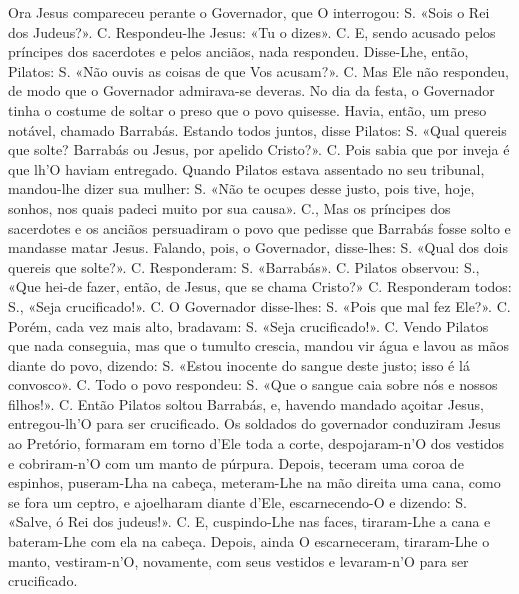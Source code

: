 \begin{paracol}{2}
{Ora Jesus compareceu perante o Governador, que O interrogou: {\redx S.} «Sois o Rei dos Judeus?». {\redx C.} Respondeu-lhe Jesus: «Tu o dizes». {\redx C.} E, sendo acusado pelos príncipes dos sacerdotes e pelos anciãos, nada respondeu. Disse-Lhe, então, Pilatos: {\redx S.} «Não ouvis as coisas de que Vos acusam?». {\redx C.} Mas Ele não respondeu, de modo que o Governador admirava-se deveras. No dia da festa, o Governador tinha o costume de soltar o preso que o povo quisesse. Havia, então, um preso notável, chamado Barrabás. Estando todos juntos, disse Pilatos: {\redx S.} «Qual quereis que solte? Barrabás ou Jesus, por apelido Cristo?». {\redx C.} Pois sabia que por inveja é que lh’O haviam entregado. Quando Pilatos estava assentado no seu tribunal, mandou-lhe dizer sua mulher: {\redx S.} «Não te ocupes desse justo, pois tive, hoje, sonhos, nos quais padeci muito por sua causa». {\redx C.}, Mas os príncipes dos sacerdotes e os anciãos persuadiram o povo que pedisse que Barrabás fosse solto e mandasse matar Jesus. Falando, pois, o Governador, disse-lhes: {\redx S.} «Qual dos dois quereis que solte?». {\redx C.} Responderam: {\redx S.} «Barrabás». {\redx C.} Pilatos observou: {\redx S.}, «Que hei-de fazer, então, de Jesus, que se chama Cristo?» {\redx C.} Responderam todos: {\redx S.}, «Seja crucificado!». {\redx C.} O Governador disse-lhes: {\redx S.} «Pois que mal fez Ele?». {\redx C.} Porém, cada vez mais alto, bradavam: {\redx S.} «Seja crucificado!». {\redx C.} Vendo Pilatos que nada conseguia, mas que o tumulto crescia, mandou vir água e lavou as mãos diante do povo, dizendo: {\redx S.} «Estou inocente do sangue deste justo; isso é lá convosco». {\redx C.} Todo o povo respondeu: {\redx S.} «Que o sangue caia sobre nós e nossos filhos!». {\redx C.} Então Pilatos soltou Barrabás, e, havendo mandado açoitar Jesus, entregou-lh’O para ser crucificado. Os soldados do governador conduziram Jesus ao Pretório, formaram em torno d’Ele toda a corte, despojaram-n’O dos vestidos e cobriram-n’O com um manto de púrpura. Depois, teceram uma coroa de espinhos, puseram-Lha na cabeça, meteram-Lhe na mão direita uma cana, como se fora um ceptro, e ajoelharam diante d’Ele, escarnecendo-O e dizendo: {\redx S.} «Salve, ó Rei dos judeus!». {\redx C.} E, cuspindo-Lhe nas faces, tiraram-Lhe a cana e bateram-Lhe com ela na cabeça. Depois, ainda O escarneceram, tiraram-Lhe o manto, vestiram-n’O, novamente, com seus vestidos e levaram-n’O para ser crucificado.
}\switchcolumn*\latim{
}
\end{paracol}
